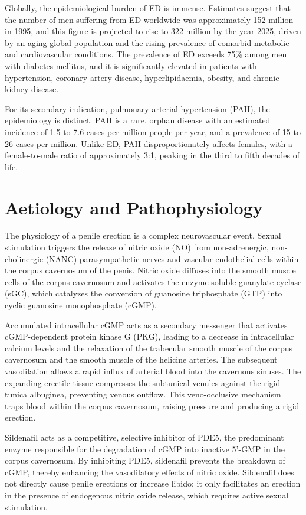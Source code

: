 Globally, the epidemiological burden of ED is immense. Estimates suggest that the number of men suffering from ED worldwide was approximately 152 million in 1995, and this figure is projected to rise to 322 million by the year 2025, driven by an aging global population and the rising prevalence of comorbid metabolic and cardiovascular conditions. The prevalence of ED exceeds 75\% among men with diabetes mellitus, and it is significantly elevated in patients with hypertension, coronary artery disease, hyperlipidaemia, obesity, and chronic kidney disease.

For its secondary indication, pulmonary arterial hypertension (PAH), the epidemiology is distinct. PAH is a rare, orphan disease with an estimated incidence of 1.5 to 7.6 cases per million people per year, and a prevalence of 15 to 26 cases per million. Unlike ED, PAH disproportionately affects females, with a female-to-male ratio of approximately 3:1, peaking in the third to fifth decades of life.

\section*{Aetiology and Pathophysiology}
The physiology of a penile erection is a complex neurovascular event. Sexual stimulation triggers the release of nitric oxide (NO) from non-adrenergic, non-cholinergic (NANC) parasympathetic nerves and vascular endothelial cells within the corpus cavernosum of the penis. Nitric oxide diffuses into the smooth muscle cells of the corpus cavernosum and activates the enzyme soluble guanylate cyclase (sGC), which catalyzes the conversion of guanosine triphosphate (GTP) into cyclic guanosine monophosphate (cGMP).

Accumulated intracellular cGMP acts as a secondary messenger that activates cGMP-dependent protein kinase G (PKG), leading to a decrease in intracellular calcium levels and the relaxation of the trabecular smooth muscle of the corpus cavernosum and the smooth muscle of the helicine arteries. The subsequent vasodilation allows a rapid influx of arterial blood into the cavernous sinuses. The expanding erectile tissue compresses the subtunical venules against the rigid tunica albuginea, preventing venous outflow. This veno-occlusive mechanism traps blood within the corpus cavernosum, raising pressure and producing a rigid erection.

Sildenafil acts as a competitive, selective inhibitor of PDE5, the predominant enzyme responsible for the degradation of cGMP into inactive 5'-GMP in the corpus cavernosum. By inhibiting PDE5, sildenafil prevents the breakdown of cGMP, thereby enhancing the vasodilatory effects of nitric oxide. Sildenafil does not directly cause penile erections or increase libido; it only facilitates an erection in the presence of endogenous nitric oxide release, which requires active sexual stimulation.

